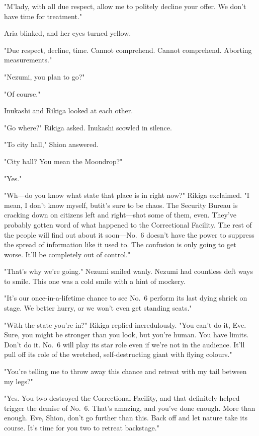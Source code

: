 "M'lady, with all due respect, allow me to politely decline your offer.
We don't have time for treatment."

Aria blinked, and her eyes turned yellow.

{\sffamily "Due respect, decline, time. Cannot comprehend. Cannot comprehend.
Aborting measurements."}

"Nezumi, you plan to go?"

"Of course."

Inukashi and Rikiga looked at each other.

"Go where?" Rikiga asked. Inukashi scowled in silence.

"To city hall," Shion answered.

"City hall? You mean the Moondrop?"

"Yes."

"Wh---do you know what state that place is in right now?" Rikiga
exclaimed. "I mean, I don't know myself, but\el it's sure to be chaos.
The Security Bureau is cracking down on citizens left and right---shot
some of them, even. They've probably gotten word of what happened to the
Correctional Facility. The rest of the people will find out about it
soon---No.~6 doesn't have the power to suppress the spread of information
like it used to. The confusion is only going to get worse. It'll be
completely out of control."

"That's why we're going." Nezumi smiled wanly. Nezumi had countless deft
ways to smile. This one was a cold smile with a hint of mockery.

"It's our once-in-a-lifetime chance to see No.~6 perform its last dying
shriek on stage. We better hurry, or we won't even get standing seats."

"With the state you're in?" Rikiga replied incredulously. "You can't do
it, Eve. Sure, you might be stronger than you look, but you're human.
You have limits. Don't do it. No.~6 will play its star role even if
we're not in the audience. It'll pull off its role of the wretched,
self-destructing giant with flying colours."

"You're telling me to throw away this chance and retreat with my tail
between my legs?"

"Yes. You two destroyed the Correctional Facility, and that definitely
helped trigger the demise of No.~6. That's amazing, and you've done
enough. More than enough. Eve, Shion, don't go further than this. Back
off and let nature take its course. It's time for you two to retreat
backstage."

